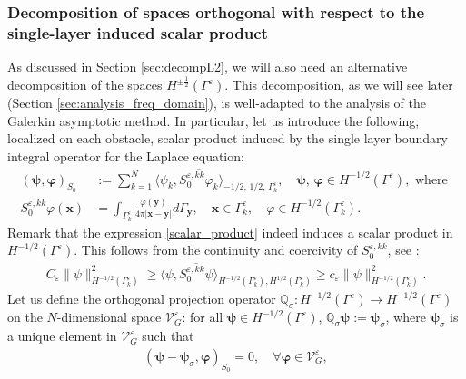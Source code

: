 \documentclass[]{article}
\numberwithin{equation}{section}
\numberwithin{theorem}{section}
\numberwithin{lemma}{section}
\numberwithin{corollary}{section}
\numberwithin{proposition}{section}
\numberwithin{definition}{section}
\newcommand{\re}{\varepsilon}
\renewcommand{\vec}{\boldsymbol}
\begin{document}
	\subsubsection{Decomposition of spaces orthogonal with respect to the single-layer induced scalar product}
	\label{sec:decompVg} As discussed in Section \ref{sec:decompL2}, we will also need an alternative decomposition of the spaces $H^{\pm \frac{1}{2}}(\Gamma^{\re})$. This decomposition, as we will see later (Section \ref{sec:analysis_freq_domain}), is well-adapted to the analysis of the Galerkin asymptotic method. In particular, let us introduce the following, localized on each obstacle, scalar product induced by the single layer boundary integral operator for the Laplace equation:
	\begin{align}
		\label{scalar_product}
		(\vec{\psi}, \vec{\varphi})_{S_0} &:= \sum_{k=1}^N \langle \psi_k, \overline{S^{\re, kk}_{0}\varphi_k } \rangle_{-1/2, \, 1/2, \, \Gamma^{\re}_k}, \quad \vec{\psi}, \, \vec{\varphi} \in H^{-1/2}(\Gamma^{\re}), \text{ where } \\
		\nonumber
		S^{\re, kk}_{0} \varphi (\boldsymbol{x}) &= \int_{\Gamma^{\re}_k} \frac{\varphi(\boldsymbol{y})}{4\pi | \boldsymbol{x} - \boldsymbol{y} |} d\Gamma_{\boldsymbol{y}}, \quad \boldsymbol{x} \in \Gamma^{\re}_k, \quad \varphi\in H^{-1/2}(\Gamma^{\re}_k).
	\end{align}
	Remark that the expression \eqref{scalar_product} indeed induces a scalar product in $H^{-1/2}(\Gamma^{\re})$. This follows from the continuity and coercivity of $S_0^{\re,kk}$, see \cite[Theorem 6.2.2]{steinbach}:
	\begin{align}
		\label{eq:ellipticityS0}
		C_{\re}\|\psi\|^2_{H^{-1/2}(\Gamma_k^{\re})}\geq  \langle \psi, \overline{S_0^{\re,kk}\psi}\rangle_{H^{-1/2}(\Gamma^{\re}_k), H^{1/2}(\Gamma^{\re}_k)}\geq c_{\re}\|\psi\|^2_{H^{-1/2}(\Gamma_k^{\re})}.
	\end{align}
	Let us define the orthogonal projection operator $\mathbb{Q}_{\sigma}: H^{-1/2}(\Gamma^{\re}) \to H^{-1/2}(\Gamma^{\re})$ on the $N$-dimensional space $\mathcal{V}^{\re}_G$: for all $\vec{\psi} \in H^{-1/2}(\Gamma^{\re})$, $\mathbb{Q}_{\sigma} \vec{\psi}:=\vec{\psi}_{\sigma}$, where $\vec{\psi}_{\sigma}$ is a unique element in $\mathcal{V}^{\re}_G$ such that
	\begin{align*}
		(\vec{\psi} - \vec{\psi}_{\sigma}, \vec{\varphi})_{S_0} = 0, \quad \forall \vec{\varphi} \in \mathcal{V}^{\re}_G,
	\end{align*}
\end{document}
